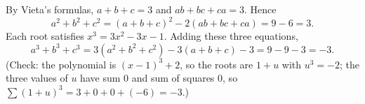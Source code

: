 By Vieta's formulas, $a+b+c=3$ and $ab+bc+ca=3$. Hence
\[a^2+b^2+c^2=(a+b+c)^2-2(ab+bc+ca)=9-6=3.\]
Each root satisfies $x^3=3x^2-3x-1$. Adding these three equations,
\[a^3+b^3+c^3=3(a^2+b^2+c^2)-3(a+b+c)-3=9-9-3=\boxed{-3}.\]
(Check: the polynomial is $(x-1)^3+2$, so the roots are $1+u$ with $u^3=-2$; the three values of $u$ have sum $0$ and sum of squares $0$, so $\sum(1+u)^3=3+0+0+(-6)=-3$.)
